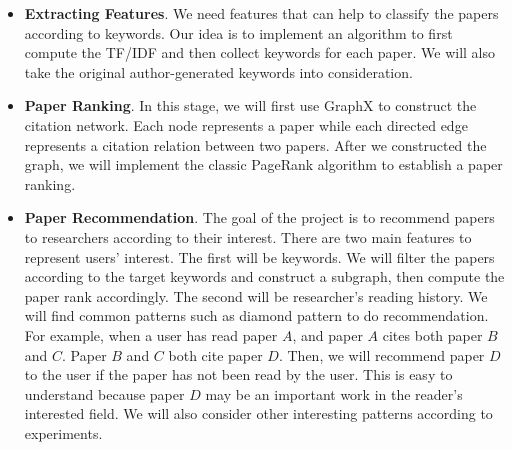\begin{itemize}
	\item \textbf{Extracting Features}. We need features that can help to classify the papers according to keywords. Our idea is to implement an algorithm to first compute the TF/IDF and then collect keywords for each paper. We will also take the original author-generated keywords into consideration.
	\item \textbf{Paper Ranking}. In this stage, we will first use GraphX to construct the citation network. Each node represents a paper while each directed edge represents a citation relation between two papers. After we constructed the graph, we will implement the classic PageRank algorithm to establish a paper ranking. 
	\item \textbf{Paper Recommendation}. The goal of the project is to recommend papers to researchers according to their interest. There are two main features to represent users' interest. The first will be keywords. We will filter the papers according to the target keywords and construct a subgraph, then compute the paper rank accordingly. The second will be researcher's reading history. We will find common patterns such as diamond pattern to do recommendation. For example, when a user has read paper $A$, and paper $A$ cites both paper $B$ and $C$. Paper $B$ and $C$ both cite paper $D$. Then, we will recommend paper $D$ to the user if the paper has not been read by the user. This is easy to understand because paper $D$ may be an important work in the reader's interested field. We will also consider other interesting patterns according to experiments.
\end{itemize}